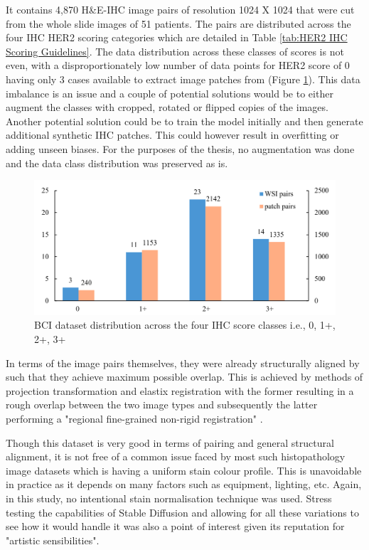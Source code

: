 It contains 4,870 H\&E-IHC image pairs of resolution 1024 X 1024 that were cut from the whole slide images of 51 patients. The pairs are distributed across the four IHC HER2 scoring categories which are detailed in Table \ref{tab:HER2 IHC Scoring Guidelines}. The data distribution across these classes of scores is not even, with a disproportionately low number of data points for HER2 score of 0 having only 3 cases available to extract image patches from (Figure \ref{fig:BCI-data-dist}). This data imbalance is an issue and a couple of  potential solutions would be to either augment the classes with cropped, rotated or flipped copies of the images. Another potential solution could be to train the model initially and then generate additional synthetic IHC patches. This could however result in overfitting or adding unseen biases. For the purposes of the thesis, no augmentation was done and the data class distribution was preserved as is.
\begin{figure}[h]
    \centering
    \includegraphics[width=1\linewidth]{4_ResearchMethodology/figures/dataDistribution.png}
    \caption[BCI data distribution]{BCI dataset distribution across the four IHC score classes i.e., 0, 1+, 2+, 3+ \parencite[Figure 8, p. 5]{Liu2022BCI:Pix2pix}}
    \label{fig:BCI-data-dist}
\end{figure}

In terms of the image pairs themselves, they were already structurally aligned by \parencite{Liu2022BCI:Pix2pix} such that they achieve maximum possible overlap. This is achieved by methods of projection transformation and elastix registration \parencite{Klein2010Elastix:Registration}  with the former resulting in a rough overlap between the two image types and subsequently the latter performing a "regional fine-grained non-rigid registration" \parencite[p. 5]{Liu2022BCI:Pix2pix}. 

Though this dataset is very good in terms of pairing and general structural alignment, it is not free of a common issue faced by most such histopathology image datasets which is having a uniform stain colour profile. This is unavoidable in practice as it depends on many factors such as equipment, lighting, etc. Again, in this study, no intentional stain normalisation technique was used. Stress testing the capabilities of Stable Diffusion and allowing for all these variations to see how it would handle it was also a point of interest given its reputation for "artistic sensibilities".

